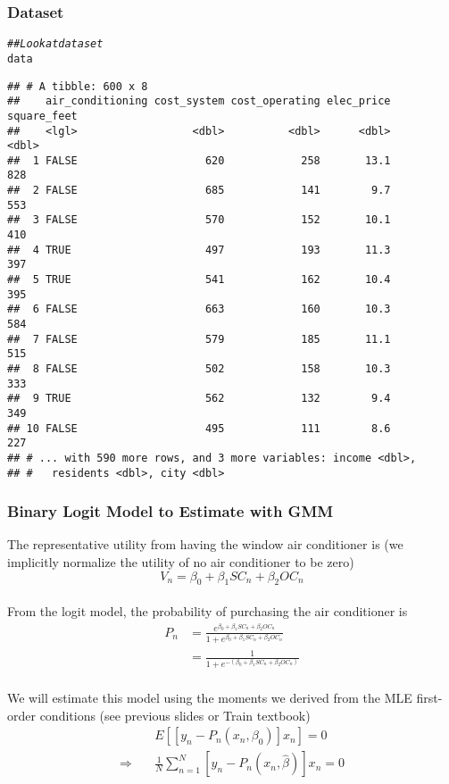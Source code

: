 \documentclass{beamer}\usepackage[]{graphicx}\usepackage[]{color}
\makeatletter
\newcommand{\hlcom}[1]{\textcolor[rgb]{0.678,0.584,0.686}{\textit{#1}}}%
\newcommand{\hlstd}[1]{\textcolor[rgb]{0.345,0.345,0.345}{#1}}%
\newenvironment{kframe}{%
 \def\at@end@of@kframe{}%
 \ifinner\ifhmode%
  \def\at@end@of@kframe{\end{minipage}}%
  \begin{minipage}{\columnwidth}%
 \fi\fi%
 \def\FrameCommand##1{\hskip\@totalleftmargin \hskip-\fboxsep
 \colorbox{shadecolor}{##1}\hskip-\fboxsep
     \hskip-\linewidth \hskip-\@totalleftmargin \hskip\columnwidth}%
 \MakeFramed {\advance\hsize-\width
   \@totalleftmargin\z@ \linewidth\hsize
   \@setminipage}}%
 {\par\unskip\endMakeFramed%
 \at@end@of@kframe}
\newenvironment{knitrout}{}{} %
\makeatother
\begin{document}
\begin{frame}[fragile]\frametitle{Dataset}
\begin{knitrout}\footnotesize
{}\color{fgcolor}\begin{kframe}
\begin{alltt}
\hlcom{## Look at dataset}
\hlstd{data}
\end{alltt}
\begin{verbatim}
## # A tibble: 600 x 8
##    air_conditioning cost_system cost_operating elec_price square_feet
##    <lgl>                  <dbl>          <dbl>      <dbl>       <dbl>
##  1 FALSE                    620            258       13.1         828
##  2 FALSE                    685            141        9.7         553
##  3 FALSE                    570            152       10.1         410
##  4 TRUE                     497            193       11.3         397
##  5 TRUE                     541            162       10.4         395
##  6 FALSE                    663            160       10.3         584
##  7 FALSE                    579            185       11.1         515
##  8 FALSE                    502            158       10.3         333
##  9 TRUE                     562            132        9.4         349
## 10 FALSE                    495            111        8.6         227
## # ... with 590 more rows, and 3 more variables: income <dbl>,
## #   residents <dbl>, city <dbl>
\end{verbatim}
\end{kframe}
\end{knitrout}
\end{frame}

\begin{frame}\frametitle{Binary Logit Model to Estimate with GMM}
    The representative utility from having the window air conditioner is (we implicitly normalize the utility of no air conditioner to be zero)
    $$V_n = \beta_0 + \beta_1 SC_n + \beta_2 OC_n$$ \\
    \vspace{2ex}
    From the logit model, the probability of purchasing the air conditioner is
    \begin{align*}
        P_n &= \frac{e^{\beta_0 + \beta_1 SC_n + \beta_2 OC_n}}{1 + e^{\beta_0 + \beta_1 SC_n + \beta_2 OC_n}} \\
        &= \frac{1}{1 + e^{-(\beta_0 + \beta_1 SC_n + \beta_2 OC_n)}}
    \end{align*} \\
    \vspace{2ex}
    We will estimate this model using the moments we derived from the MLE first-order conditions (see previous slides or Train textbook)
    \begin{align*}
        &E[[y_n - P_n(x_n, \beta_0)] x_n] = 0 \\
        \Rightarrow \quad &\frac{1}{N} \sum_{n = 1}^N [y_n - P_n(x_n, \hat{\beta})] x_n = 0
    \end{align*}
\end{frame}
\end{document}
